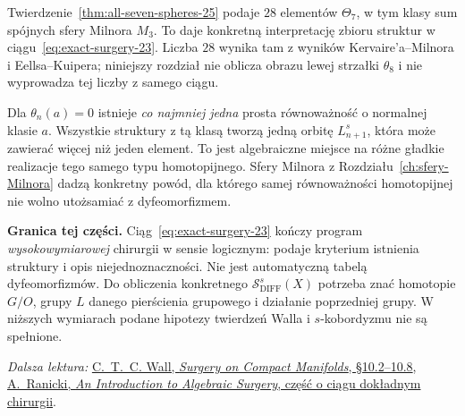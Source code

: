 Twierdzenie~\ref{thm:all-seven-spheres-25}
podaje $28$ elementów $\Theta_7$, w tym
klasy sum spójnych sfery Milnora $M_3$.
To daje konkretną interpretację zbioru
struktur w ciągu~\eqref{eq:exact-surgery-23}.
Liczba $28$ wynika tam z wyników
Kervaire'a--Milnora i Eellsa--Kuipera;
niniejszy rozdział nie oblicza obrazu
lewej strzałki $\theta_8$ i nie wyprowadza
tej liczby z samego ciągu.

\begin{przyklad}
\label{prz:nonunique-structure-23}
Dla $\theta_n(a)=0$ istnieje
\emph{co najmniej jedna} prosta równoważność
o normalnej klasie $a$. Wszystkie
struktury z tą klasą tworzą jedną orbitę
$L_{n+1}^s$, która może zawierać
więcej niż jeden element.
To jest algebraiczne miejsce na różne
gładkie realizacje tego samego typu
homotopijnego. Sfery Milnora z
Rozdziału~\ref{ch:sfery-Milnora}
dadzą konkretny powód, dla którego
samej równoważności homotopijnej
nie wolno utożsamiać z dyfeomorfizmem.
\end{przyklad}

\noindent\textbf{Granica tej części.}
Ciąg~\eqref{eq:exact-surgery-23} kończy
program \emph{wysokowymiarowej} chirurgii
w sensie logicznym: podaje kryterium
istnienia struktury i opis niejednoznaczności.
Nie jest automatyczną tabelą dyfeomorfizmów.
Do obliczenia konkretnego $\mathcal S^s_{\mathrm{DIFF}}(X)$
potrzeba znać homotopie $G/O$, grupy $L$
danego pierścienia grupowego i działanie
poprzedniej grupy. W niższych wymiarach
podane hipotezy twierdzeń Walla i
$s$-kobordyzmu nie są spełnione.

\par\smallskip
{\footnotesize\noindent\emph{Dalsza lektura:}
\href{https://webhomes.maths.ed.ac.uk/~v1ranick/books/scm.pdf}
{C.~T.~C. Wall, \emph{Surgery on Compact Manifolds}, §10.2--10.8},
\href{https://www.maths.ed.ac.uk/~v1ranick/surgery/ranicki.pdf}
{A.\ Ranicki, \emph{An Introduction to Algebraic Surgery},
część o ciągu dokładnym chirurgii}.\par}

\clearpage
